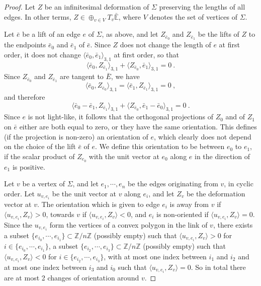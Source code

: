 \documentclass[notitlepage,twoside,a4paper]{amsart}
\theoremstyle{named}
\newcommand{\Z}{{\mathbb Z}}
\newcommand{\bE}{{\mathbb E}}
\newcounter{notes}%
\begin{document}
\begin{proof}
  Let $Z$ be an infinitesimal deformation of $\Sigma$ preserving the lengths of all edges. In other terms, $Z\in \oplus_{v\in V}T_v\bar \bE$, where $V$ denotes the set of vertices of $\Sigma$.

  Let $\bar e$ be a lift of an edge $e$ of $\Sigma$, as above, and let $Z_{\bar e_0}$ and $Z_{\bar e_1}$ be the lifts of $Z$ to the endpoints $\bar e_0$ and $\bar e_1$ of $\bar e$. Since $Z$ does not change the length of $e$ at first order, it does not change $\langle \bar e_0,\bar e_1\rangle_{3,1}$ at first order, so that
  $$ \langle \bar e_0, Z_{\bar e_1}\rangle_{3,1} +\langle Z_{\bar e_0}, \bar e_1\rangle_{3,1}=0~. $$
  Since $Z_{\bar e_0}$ and $Z_{\bar e_1}$ are tangent to $\bar E$, we have
  $$ \langle \bar e_0, Z_{\bar e_0}\rangle_{3,1} = \langle \bar e_1, Z_{\bar e_1}\rangle_{3,1}=0~, $$
  and therefore
  $$ \langle \bar e_0-\bar e_1, Z_{\bar e_1}\rangle_{3,1} +\langle Z_{\bar e_0}, \bar e_1 - \bar e_0\rangle_{3,1}=0~. $$
  Since $e$ is not light-like, it follows that the orthogonal projections of $Z_0$ and of $Z_1$ on $\bar e$ either are both equal to zero, or they have the same orientation. This defines (if the projection is non-zero) an orientation of $e$, which clearly does not depend on the choice of the lift $\bar e$ of $e$. We define this orientation to be between $e_0$ to $e_1$, if the scalar product of $Z_{e_0}$ with the unit vector at $e_0$ along $e$ in the direction of $e_1$ is positive.

  Let $v$ be a vertex of $\Sigma$, and let $e_1, \cdots, e_n$ be the edges originating from $v$, in cyclic order. Let $u_{v,e_i}$ be the unit vector at $v$ along $e_i$, and let $Z_v$ be the deformation vector at $v$. The orientation which is given to edge $e_i$ is away from $v$ if $\langle u_{v,e_i}, Z_v\rangle>0$, towards $v$ if $\langle u_{v,e_i}, Z_v\rangle<0$, and $e_i$ is non-oriented if $\langle u_{v, e_i}, Z_v\rangle=0$. Since the $u_{v,e_i}$ form the vertices of a convex polygon in the link of $v$, there exists a subset $\{ e_{i_0}, \cdots, e_{i_1}\}\subset \Z/n\Z$ (possibly empty) such that $\langle u_{v, e_i}, Z_v\rangle>0$ for $i\in \{ e_{i_0}, \cdots, e_{i_1}\}$, a subset $\{ e_{i_2}, \cdots, e_{i_3}\}\subset \Z/n\Z$ (possibly empty) such that $\langle u_{v, e_i}, Z_v\rangle<0$ for $i\in \{ e_{i_2}, \cdots, e_{i_3}\}$, with at most one index between $i_1$ and $i_2$ and at most one index between $i_3$ and $i_0$ such that $\langle u_{v, e_i}, Z_v\rangle=0$. So in total there are at most 2 changes of orientation around $v$.


\end{proof}
\end{document}
